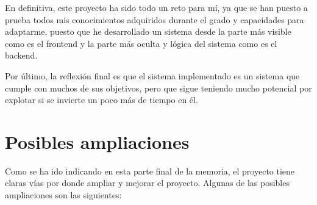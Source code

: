 En definitiva, este proyecto ha sido todo un reto para mí, ya que se han puesto a prueba todos mis conocimientos adquiridos durante el grado y capacidades para adaptarme, puesto que he desarrollado un sistema desde la parte más visible como es el frontend y la parte más oculta y lógica del sistema como es el backend.

Por último, la reflexión final es que el sistema implementado es un sistema que cumple con muchos de sus objetivos, pero que sigue teniendo mucho potencial por explotar si se invierte un poco más de tiempo en él.

\section{Posibles ampliaciones}

Como se ha ido indicando en esta parte final de la memoria, el proyecto tiene claras vías por donde ampliar y mejorar el proyecto. Algunas de las posibles ampliaciones son las siguientes:

